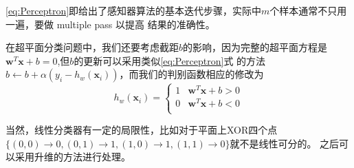 \documentclass{article}
\begin{document}
\eqref{eq:Perceptron}即给出了感知器算法的基本迭代步骤，实际中$m$个样本通常不只用一遍，要做 multiple pass 以提高 结果的准确性。

在超平面分类问题中，我们还要考虑截距$b$的影响，因为完整的超平面方程是$\bm{w}^T\bm{x}+b=0$,但$b$的更新可以采用类似\eqref{eq:Perceptron}式
的方法$b \leftarrow b+\alpha (y_i-h_w(\bm{x}_i))$，而我们的判别函数相应的修改为
\begin{equation}
h_w(\bm{x}_i)=\begin{cases}
1 & \bm{w}^T\bm{x}+b>0\\
0 & \bm{w}^T\bm{x}+b<0 \\
\end{cases}
\end{equation}

当然，线性分类器有一定的局限性，比如对于平面上XOR四个点$\{(0,0)\rightarrow 0,(0,1)\rightarrow 1,(1,0)\rightarrow 1,(1,1)\rightarrow 0\}$就不是线性可分的。
之后可以采用升维的方法进行处理。
\end{document}
